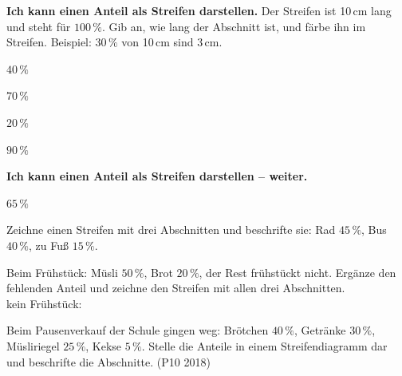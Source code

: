 \begin{aufgabe}{\textbf{Ich kann einen Anteil als Streifen darstellen.} Der Streifen ist 10\,cm lang und steht für $100\,\%$. Gib an, wie lang der Abschnitt ist, und färbe ihn im Streifen.}
Beispiel: $30\,\%$ von 10\,cm sind 3\,cm.


\begin{teile}
\teil $40\,\%$\par\noindent\begin{minipage}[b]{11cm}\streifenleer\end{minipage}\hfill\leerfeld[cm]
\teil $70\,\%$\par\noindent\begin{minipage}[b]{11cm}\streifenleer\end{minipage}\hfill\leerfeld[cm]
\teil $20\,\%$\par\noindent\begin{minipage}[b]{11cm}\streifenleer\end{minipage}\hfill\leerfeld[cm]
\teil $90\,\%$\par\noindent\begin{minipage}[b]{11cm}\streifenleer\end{minipage}\hfill\leerfeld[cm]
\end{teile}
\end{aufgabe}

\begin{aufgabe}{\textbf{Ich kann einen Anteil als Streifen darstellen – weiter.}}
\begin{teile}
\teil $65\,\%$\par\noindent\begin{minipage}[b]{11cm}\streifenleer\end{minipage}\hfill\leerfeld[cm]
\teil Zeichne einen Streifen mit drei Abschnitten und beschrifte sie: Rad $45\,\%$, Bus $40\,\%$, zu Fuß $15\,\%$.\par
\streifenleer
\teil Beim Frühstück: Müsli $50\,\%$, Brot $20\,\%$, der Rest frühstückt nicht. Ergänze den fehlenden Anteil und zeichne den Streifen mit allen drei Abschnitten.\\ kein Frühstück: \leerfeld[\%]\par
\streifenleer
\teil Beim Pausenverkauf der Schule gingen weg: Brötchen $40\,\%$, Getränke $30\,\%$, Müsliriegel $25\,\%$, Kekse $5\,\%$. Stelle die Anteile in einem Streifendiagramm dar und beschrifte die Abschnitte. (P10 2018)\par
\streifenleer
\end{teile}
\end{aufgabe}

